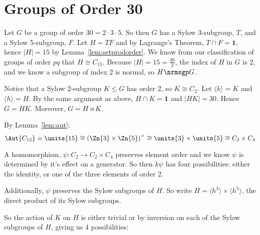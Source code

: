 \section{Groups of Order 30}
Let \(G\) be a group of order \(30 = 2 \cdot 3 \cdot 5\).
So then \(G\) has a Sylow 3-subgroup, \(T\), and a Sylow 5-subgroup, \(F\).
Let \(H = TF\) and by Lagrange's Theorem, \(T \cap F = \bm{1}\), hence \(|H| = 15\) by Lemma~\ref{lem:setprodorder}.
We know from our classification of groups of order \(pq\) that \(H \cong C_{15}\).
Because \(|H| = 15 = \frac{30}{2}\), the index of \(H\) in \(G\) is 2, and we know a subgroup of index 2 is normal, so \(H \nrmsgp G\).

Notice that a Sylow 2-subgroup \(K \leqslant G\) has order 2, so \(K \cong C_2\).
Let \(\langle k \rangle = K\) and \(\langle h \rangle = H\).
By the same argument as above, \(H \cap K = \bm{1}\) and \(|HK| = 30\).
Hence \(G = HK\).
Moreover, \(G = H \rtimes K\).

By Lemma~\ref{lem:aut}:
\[\Aut{C_{15}} = \units{15} \cong {(\Zn{3} \times \Zn{5})}^\times \cong \units{3} \times \units{5} \cong C_2 \times C_4\]

A homomorphism, \(\psi:C_2 \to C_2 \times C_4\) preserves element order and we know \(\psi\) is determined by it's effect on a generator.
So then \(k\psi\) has four possibilities: either the identity, or one of the three elements
of order 2.

Additionally, \(\psi\) preserves the Sylow subgroups of \(H\).
So write \(H = \langle h^3 \rangle \times \langle h^5 \rangle\), the direct product of its Sylow subgroups.

So the action of \(K\) on \(H\) is either trivial or by inversion on each of the Sylow subgroups of \(H\), giving us 4
possibilities:

